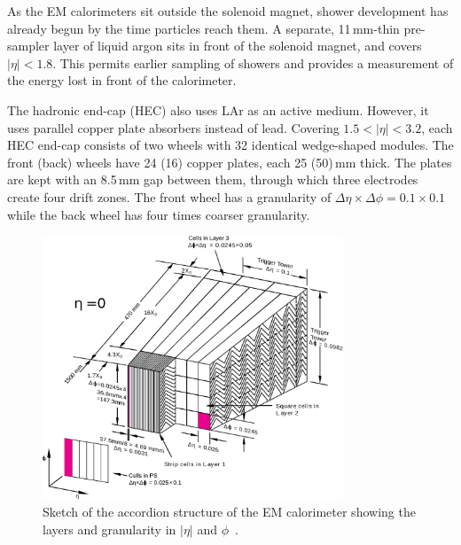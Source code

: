 As the EM calorimeters sit outside the solenoid magnet, shower development has already begun by the time particles reach them. A separate, 11\,mm-thin pre-sampler layer of liquid argon sits in front of the solenoid magnet, and covers $|\eta|<1.8$. This permits earlier sampling of showers and provides a measurement of the energy lost in front of the calorimeter. 

The hadronic end-cap (HEC) also uses LAr as an active medium. However, it uses parallel copper plate absorbers instead of lead. Covering $1.5<|\eta|<3.2$, each HEC end-cap consists of two wheels with 32 identical wedge-shaped modules. The front (back) wheels have 24 (16) copper plates, each 25 (50)\,mm thick. The plates are kept with an 8.5\,mm gap between them, through which three electrodes create four drift zones. The front wheel has a granularity of $\Delta\eta\times\Delta\phi=0.1\times0.1$ while the back wheel has four times coarser granularity.

\begin{figure}[tb]
\begin{center}
\includegraphics[width=0.8\textwidth]{figures/ATLAS/lar_cross}
\caption[Liquid Argon electromagnetic calorimeter layout]{Sketch of the accordion structure of the EM calorimeter showing the layers and granularity in $|\eta|$ and $\phi$~\cite{LAr_TDR}.}
\label{fig:lar_cross}
\end{center}
\end{figure}



